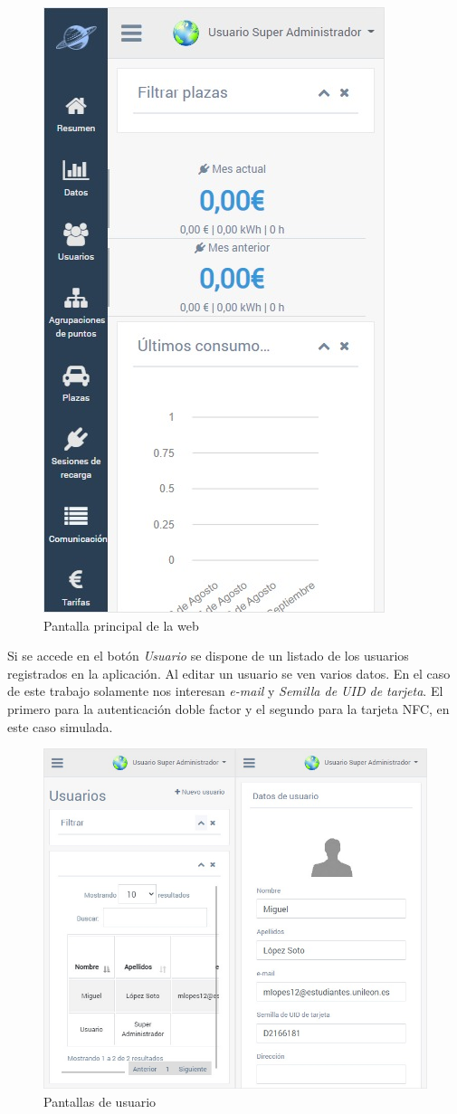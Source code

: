 \documentclass[12pt,a4paper,onecolumn,oneside]{report}
\begin{document}
\begin{figure}[H] 
\centering
  \includegraphics[width=.5\textwidth]{figuras/design2.png}
  \caption[Pantalla principal de la web]{Pantalla principal de la web\\
  }
  \label{fig:design2}
\end{figure}

Si se accede en el botón \textit{Usuario} se dispone de un listado de los usuarios registrados en la aplicación. Al editar un usuario se ven varios datos. En el caso de este trabajo solamente nos interesan \textit{e-mail} y \textit{Semilla de UID de tarjeta}. El primero para la autenticación doble factor y el segundo para la tarjeta NFC, en este caso simulada.

\begin{figure}[H] 
\centering
  \includegraphics[width=1\textwidth]{figuras/design3.png}
  \caption[Pantallas de usuario]{Pantallas de usuario\\
  }
  \label{fig:design3}
\end{figure}
\end{document}
